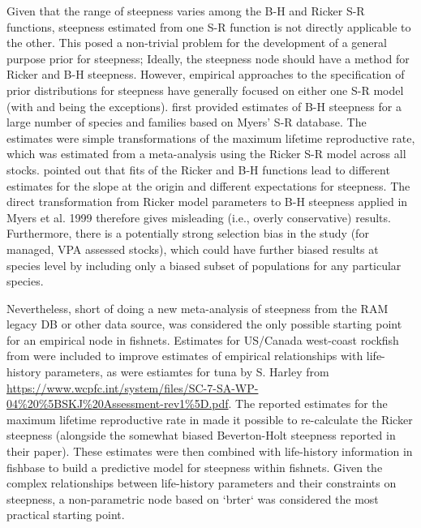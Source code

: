 \documentclass{dragonfly-report}
\begin{document}
Given that the range of steepness varies among the B-H and Ricker S-R functions, steepness estimated from one S-R function is not directly applicable to the other. This posed a non-trivial problem for the development of a general purpose prior for steepness; Ideally, the steepness node should have a method for Ricker and B-H steepness. However, empirical approaches to the specification of prior distributions for steepness have generally focused on either one S-R model (with \citet{michielsens_2004_bayesian} and \citet{forrest2010hierarchical} being the exceptions). \citet{myers_1999_maximum} first provided estimates of B-H steepness for a large number of species and families based on Myers' S-R database. The estimates were simple transformations of the maximum lifetime reproductive rate, which was estimated from a meta-analysis using the Ricker S-R model across all stocks. \citet{michielsens_2004_bayesian} pointed out that fits of the Ricker and B-H functions lead to different estimates for the slope at the origin and different expectations for steepness. The direct transformation from Ricker model parameters to B-H steepness applied in Myers et al. 1999 therefore gives misleading (i.e., overly conservative) results. Furthermore, there is a potentially strong selection bias in the study (for managed, VPA assessed stocks), which could have further biased results at species level by including only a biased subset of populations for any particular species.

Nevertheless, short of doing a new meta-analysis of steepness from the RAM legacy DB or other data source, \citet{myers_1999_maximum} was considered the only possible starting point for an empirical node in fishnets. Estimates for US/Canada west-coast rockfish from \citet{forrest2010hierarchical} were included to improve estimates of empirical relationships with life-history parameters, as were estiamtes for tuna by S. Harley from \url{https://www.wcpfc.int/system/files/SC-7-SA-WP-04\%20\%5BSKJ\%20Assessment-rev1\%5D.pdf}. The reported estimates for the maximum lifetime reproductive rate in \citet{myers_1999_maximum} made it possible to re-calculate the Ricker steepness (alongside the somewhat biased Beverton-Holt steepness reported in their paper). These estimates were then combined with life-history information in fishbase to build a predictive model for steepness within fishnets. Given the complex relationships between life-history parameters and their constraints on steepness, a non-parametric node based on `brter` was considered the most practical starting point.
\end{document}
